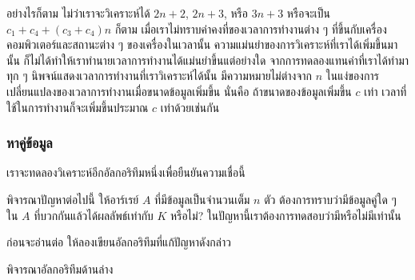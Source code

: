 อย่างไรก็ตาม ไม่ว่า{\wbr}เรา{\wbr}จะ{\wbr}วิเคราะห์{\wbr}ได้ $2n+2$, $2n+3$, หรือ $3n+3$ หรือ{\wbr}จะ{\wbr}เป็น{\wbr}
$c_1+c_4 + (c_3+c_4)n$ ก็ตาม เมื่อ{\wbr}เรา{\wbr}ไม่{\wbr}ทราบ{\wbr}ค่าคงที่{\wbr}ของ{\wbr}เวลา{\wbr}การ{\wbr}ทำงาน{\wbr}ต่าง ๆ
ที่{\wbr}ขึ้น{\wbr}กับ{\wbr}เครื่อง{\wbr}คอมพิวเตอร์{\wbr}และ{\wbr}สถานะ{\wbr}ต่าง ๆ ของ{\wbr}เครื่องใน{\wbr}เวลา{\wbr}นั้น{\wbr}
ความ{\wbr}แม่นยำ{\wbr}ของ{\wbr}การ{\wbr}วิเคราะห์{\wbr}ที่{\wbr}เรา{\wbr}ได้{\wbr}เพิ่ม{\wbr}ขึ้น{\wbr}มา{\wbr}นั้น{\wbr}
ก็{\wbr}ไม่{\wbr}ได้{\wbr}ทำ{\wbr}ให้{\wbr}เรา{\wbr}ทำนาย{\wbr}เวลา{\wbr}การ{\wbr}ทำงาน{\wbr}ได้{\wbr}แม่นยำ{\wbr}ขึ้น{\wbr}แต่อย่างใด{\wbr}
จาก{\wbr}การ{\wbr}ทดลอง{\wbr}แทน{\wbr}ค่า{\wbr}ที่{\wbr}เรา{\wbr}ได้{\wbr}ทำ{\wbr}มา ทุก ๆ นิพจน์{\wbr}แสดง{\wbr}เวลา{\wbr}การ{\wbr}ทำงาน{\wbr}ที่{\wbr}เรา{\wbr}วิเคราะห์{\wbr}ได้{\wbr}นั้น{\wbr}
มี{\wbr}ความหมาย{\wbr}ไม่{\wbr}ต่าง{\wbr}จาก $n$
ใน{\wbr}แง่{\wbr}ของ{\wbr}การ{\wbr}เปลี่ยนแปลง{\wbr}ของ{\wbr}เวลา{\wbr}การ{\wbr}ทำงาน{\wbr}เมื่อ{\wbr}ขนาด{\wbr}ข้อมูล{\wbr}เพิ่ม{\wbr}ขึ้น นั่น{\wbr}คือ{\wbr}
ถ้า{\wbr}ขนาด{\wbr}ของ{\wbr}ข้อมูล{\wbr}เพิ่ม{\wbr}ขึ้น $c$ เท่า เวลา{\wbr}ที่{\wbr}ใช้{\wbr}ใน{\wbr}การ{\wbr}ทำงาน{\wbr}ก็{\wbr}จะ{\wbr}เพิ่ม{\wbr}ขึ้น{\wbr}ประมาณ $c$
เท่า{\wbr}ด้วย{\wbr}เช่นกัน{\wbr}

\subsubsection{หาคู่{\wbr}ข้อมูล}
เรา{\wbr}จะ{\wbr}ทดลอง{\wbr}วิเคราะห์{\wbr}อีก{\wbr}อัล{\wbr}กอ{\wbr}ริ{\wbr}ทึม{\wbr}หนึ่ง{\wbr}เพื่อ{\wbr}ยืนยัน{\wbr}ความ{\wbr}เชื่อ{\wbr}นี้{\wbr}

พิจารณา{\wbr}ปัญหา{\wbr}ต่อไปนี้ ให้{\wbr}อาร์เรย์ $A$ ที่{\wbr}มี{\wbr}ข้อมูล{\wbr}เป็น{\wbr}จำนวนเต็ม $n$ ตัว{\wbr}
ต้องการ{\wbr}ทราบ{\wbr}ว่า{\wbr}มี{\wbr}ข้อมูล{\wbr}คู่{\wbr}ใด ๆ ใน $A$ ที่{\wbr}บวก{\wbr}กัน{\wbr}แล้ว{\wbr}ได้{\wbr}ผลลัพธ์{\wbr}เท่า{\wbr}กับ $K$ หรือ{\wbr}ไม่?
ใน{\wbr}ปัญหา{\wbr}นี้{\wbr}เรา{\wbr}ต้องการ{\wbr}ทดสอบ{\wbr}ว่า{\wbr}มี{\wbr}หรือ{\wbr}ไม่{\wbr}มี{\wbr}เท่านั้น{\wbr}

\begin{quiz}{}
ก่อน{\wbr}จะ{\wbr}อ่าน{\wbr}ต่อ ให้{\wbr}ลอง{\wbr}เขียน{\wbr}อัล{\wbr}กอ{\wbr}ริ{\wbr}ทึม{\wbr}ที่{\wbr}แก้{\wbr}ปัญหา{\wbr}ดังกล่าว{\wbr}
\end{quiz}

พิจารณา{\wbr}อัล{\wbr}กอ{\wbr}ริ{\wbr}ทึม{\wbr}ด้าน{\wbr}ล่าง{\wbr}

